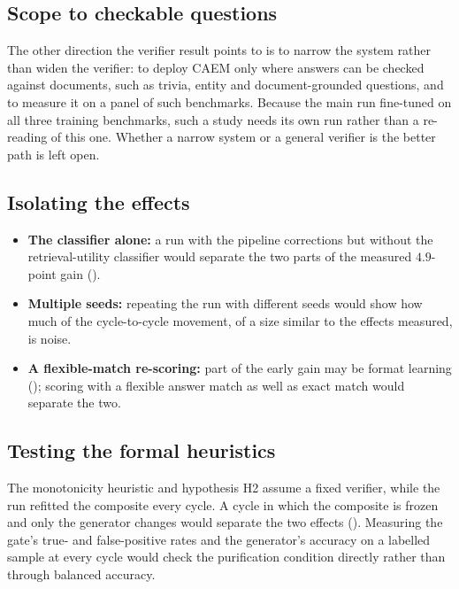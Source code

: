 \subsection{Scope to checkable questions}
\label{sec:future-transfer}

The other direction the verifier result points to is to narrow the system rather than widen the verifier: to deploy CAEM only where answers can be checked against documents, such as trivia, entity and document-grounded questions, and to measure it on a panel of such benchmarks. Because the main run fine-tuned on all three training benchmarks, such a study needs its own run rather than a re-reading of this one. Whether a narrow system or a general verifier is the better path is left open.

\subsection{Isolating the effects}
\label{sec:future-ablations}

\begin{itemize}
    \item \textbf{The classifier alone:} a run with the pipeline corrections but without the retrieval-utility classifier would separate the two parts of the measured $4.9$-point gain ().
    \item \textbf{Multiple seeds:} repeating the run with different seeds would show how much of the cycle-to-cycle movement, of a size similar to the effects measured, is noise.
    \item \textbf{A flexible-match re-scoring:} part of the early gain may be format learning (); scoring with a flexible answer match as well as exact match would separate the two.
\end{itemize}

\subsection{Testing the formal heuristics}
\label{sec:future-fixed-composite}

The monotonicity heuristic and hypothesis H2 assume a fixed verifier, while the run refitted the composite every cycle. A cycle in which the composite is frozen and only the generator changes would separate the two effects (). Measuring the gate's true- and false-positive rates and the generator's accuracy on a labelled sample at every cycle would check the purification condition directly rather than through balanced accuracy.

